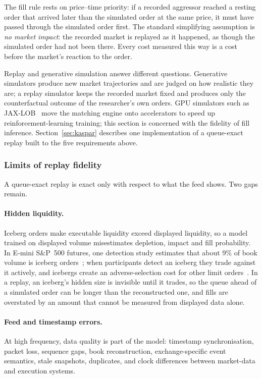 The fill rule rests on price--time priority: if a recorded aggressor reached a resting order that
arrived later than the simulated order at the same price, it must have passed through the
simulated order first. The standard simplifying assumption is \emph{no market impact}: the
recorded market is replayed as it happened, as though the simulated order had not been there. Every
cost measured this way is a cost before the market's reaction to the order.

Replay and generative simulation answer different questions. Generative simulators produce new
market trajectories and are judged on how realistic they are; a replay simulator keeps the recorded
market fixed and produces only the counterfactual outcome of the researcher's own orders. GPU
simulators such as JAX-LOB~\citep{frey2023} move the matching engine onto accelerators to speed up
reinforcement-learning training; this section is concerned with the fidelity of fill inference. Section~\ref{sec:kaspar} describes one implementation of a queue-exact replay built to the five
requirements above.

\subsubsection{Limits of replay fidelity}
\label{sec:replay-limits}

A queue-exact replay is exact only with respect to what the feed shows. Two gaps remain.

\paragraph{Hidden liquidity.} Iceberg orders make executable liquidity exceed displayed liquidity,
so a model trained on displayed volume misestimates depletion, impact and fill probability. In
E-mini S\&P~500 futures, one detection study estimates that about 9\% of book volume is iceberg
orders~\citep{christensen2013}; when participants detect an iceberg they trade against it actively, and
icebergs create an adverse-selection cost for other limit orders~\citep{frey2017iceberg}. In a replay, an
iceberg's hidden size is invisible until it trades, so the queue ahead of a simulated order can be longer than the
reconstructed one, and fills are overstated by an amount that cannot be measured from displayed data alone.

\paragraph{Feed and timestamp errors.} At high frequency, data quality is part of the model:
timestamp synchronisation, packet loss, sequence gaps, book reconstruction, exchange-specific event
semantics, stale snapshots, duplicates, and clock differences between market-data and execution
systems.

